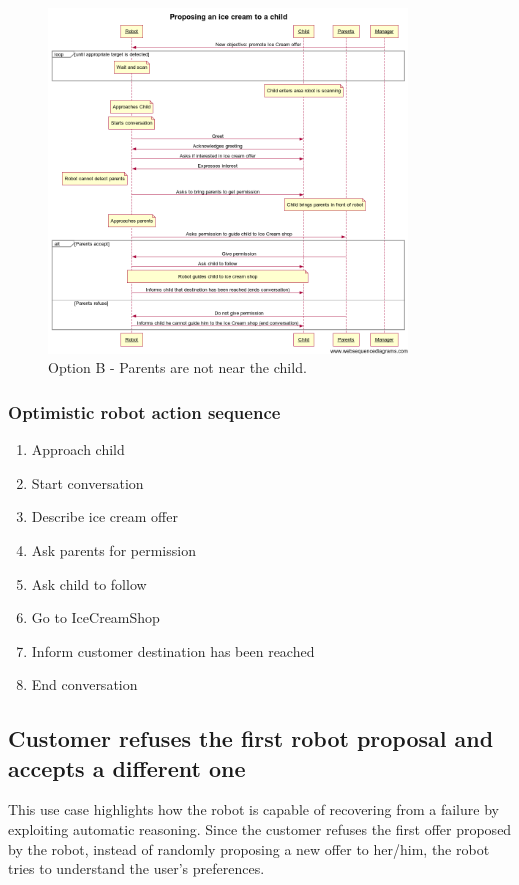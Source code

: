 \begin{figure}[!h]
\includegraphics[width=0.85\textwidth]{iceCreamB}
\protect\caption{Option B - Parents are not near the child.}
\end{figure}



\subsubsection{Optimistic robot action sequence}
\begin{enumerate}
\item Approach child
\item Start conversation
\item Describe ice cream offer
\item Ask parents for permission
\item Ask child to follow
\item Go to IceCreamShop
\item Inform customer destination has been reached
\item End conversation
\end{enumerate}

\newpage

\subsection{Customer refuses the first robot proposal and accepts a different one}

This use case highlights how the robot is capable of
recovering from a failure by exploiting automatic reasoning.
Since the customer refuses the first offer proposed by the robot, instead of randomly proposing a new offer to her/him, the robot tries to understand the user's preferences.

